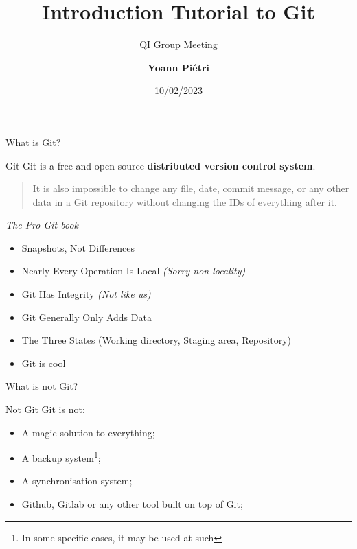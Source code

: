 \documentclass[10pt,aspectratio=169]{beamer}
\title{\vspace*{60pt}\LARGE Introduction Tutorial to Git}
\subtitle{QI Group Meeting}
\date{10/02/2023}
\author{\large\textbf{Yoann Piétri}}
\institute{LIP6 - Sorbonne Université - CNRS}
\begin{document}

\maketitle

{
    \begin{frame}
        What is Git?
    \end{frame}
}

\begin{frame}{Git}
    Git is a free and open source \textbf{distributed version control system}.

    \vspace*{\baselineskip}

    \begin{quote}
        It is also impossible to change any file, date, commit message, or any other data in a Git repository without changing the IDs of everything after it.
    \end{quote}
    \begin{flushright}
        \textit{The Pro Git book}
    \end{flushright}

    \begin{multicols}{2}
        \begin{itemize}
            \item Snapshots, Not Differences
            \item Nearly Every Operation Is Local \textit{(Sorry non-locality)}
            \item Git Has Integrity \textit{(Not like us)}
            \item Git Generally Only Adds Data
            \item The Three States (Working directory, Staging area, Repository)
            \item Git is cool
        \end{itemize}
    \end{multicols}
\end{frame}


{
\begin{frame}
    What is not Git?
\end{frame}
}

\begin{frame}{Not Git}
    Git is not:

    \begin{itemize}
        \item A magic solution to everything;
        \item A backup system\footnote{In some specific cases, it may be used at such};
        \item A synchronisation system;
        \item Github, Gitlab or any other tool built on top of Git;
    \end{itemize}
\end{frame}
\end{document}
